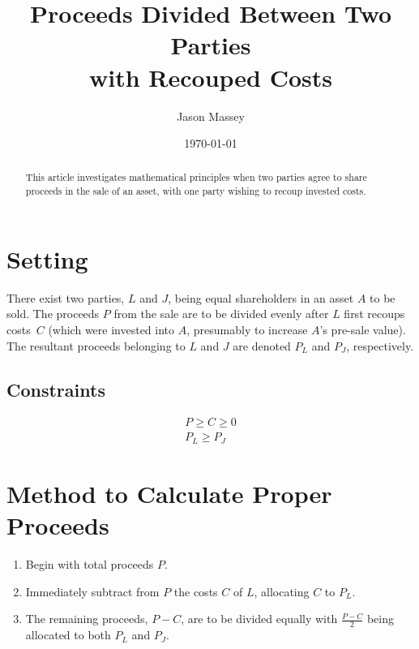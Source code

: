 \documentclass[10pt,letterpaper,oneside]{article}
\begin{document}
\title{Proceeds Divided Between Two Parties\\with Recouped Costs}
\author{Jason Massey}
\date{\today}
\maketitle

\begin{abstract}
This article investigates mathematical principles when two parties agree to share proceeds in the sale of an asset,
with one party wishing to recoup invested costs.
\end{abstract}

\section{Setting}
There exist two parties, $L$ and $J$, being equal shareholders in an asset $A$ to be sold.
The proceeds $P$ from the sale are to be divided evenly after $L$ first recoups costs~$C$ (which were invested into $A$,
presumably to increase $A$'s pre-sale value).
The resultant proceeds belonging to $L$ and $J$ are denoted $P_L$ and $P_J$, respectively.

\subsection*{Constraints}
\begin{gather*}
P \ge C \ge 0               \\[10pt]
P_L \ge P_J
\end{gather*}

\section{Method to Calculate Proper Proceeds}
\begin{enumerate}
\item Begin with total proceeds $P$.
\item Immediately subtract from $P$ the costs $C$ of $L$, allocating $C$ to $P_L$.
\item The remaining proceeds, $P-C$, are to be divided equally with $\frac{P-C}{2}$ being allocated to both $P_L$ and $P_J$.
\end{enumerate}
\end{document}
